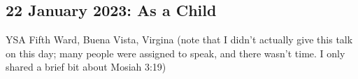 				
	\subsection{22 January 2023: As a Child}
		\label{TALKS-22-01-2023}
		
		YSA Fifth Ward, Buena Vista, Virgina (note that I didn't actually give this talk on this day; many people were assigned to speak, and there wasn't time. I only shared a brief bit about Mosiah 3:19)
		
